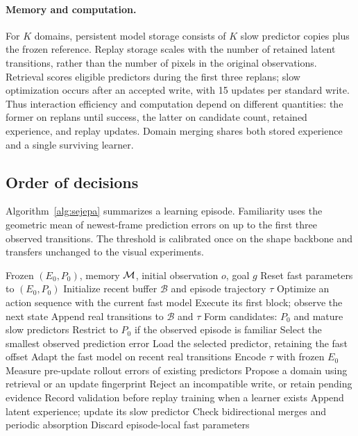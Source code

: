 \paragraph{Memory and computation.}
For $K$ domains, persistent model storage consists of $K$ slow predictor copies plus the frozen reference. Replay storage scales with the number of retained latent transitions, rather than the number of pixels in the original observations. Retrieval scores eligible predictors during the first three replans; slow optimization occurs after an accepted write, with 15 updates per standard write. Thus interaction efficiency and computation depend on different quantities: the former on replans until success, the latter on candidate count, retained experience, and replay updates. Domain merging shares both stored experience and a single surviving learner.

\subsection{Order of decisions}
Algorithm~\ref{alg:sejepa} summarizes a learning episode. Familiarity uses the geometric mean of newest-frame prediction errors on up to the first three observed transitions. The threshold is calibrated once on the shape backbone and transfers unchanged to the visual experiments.

\begin{algorithm}[t]
\caption{One deployment-learning episode of \ours}
\label{alg:sejepa}
\begin{algorithmic}[1]
  \Require Frozen $(E_0,P_0)$, memory $\mathcal{M}$, initial observation $o$, goal $g$
  \State Reset fast parameters to $(E_0,P_0)$
  \State Initialize recent buffer $\mathcal{B}$ and episode trajectory $\tau$
    \State Optimize an action sequence with the current fast model
    \State Execute its first block; observe the next state
    \State Append real transitions to $\mathcal{B}$ and $\tau$
      \State Form candidates: $P_0$ and mature slow predictors
      \State Restrict to $P_0$ if the observed episode is familiar
      \State Select the smallest observed prediction error
      \State Load the selected predictor, retaining the fast offset
    \EndIf
    \State Adapt the fast model on recent real transitions
  \EndWhile
  \State Encode $\tau$ with frozen $E_0$
  \State Measure pre-update rollout errors of existing predictors
    \State Propose a domain using retrieval or an update fingerprint
    \State Reject an incompatible write, or retain pending evidence
      \State Record validation before replay training when a learner exists
      \State Append latent experience; update its slow predictor
      \State Check bidirectional merges and periodic absorption
    \EndIf
  \EndIf
  \State Discard episode-local fast parameters
\end{algorithmic}
\end{algorithm}

